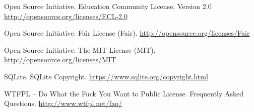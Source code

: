 \documentclass[12pt,letterpaper]{article}
\begin{document}
\begin{thebibliography}{20}
 Open Source Initiative. Education Community License, Version 2.0 \url{http://opensource.org/licenses/ECL-2.0}

 Open Source Initiative. Fair License (Fair). \url{http://opensource.org/licenses/Fair}

 Open Source Initiative. The MIT License (MIT). \url{http://opensource.org/licenses/MIT}

 SQLite. SQLite Copyright. \url{https://www.sqlite.org/copyright.html}

 WTFPL – Do What the Fuck You Want to Public License. Frequently Asked Questions. \url{http://www.wtfpl.net/faq/}

\end{thebibliography}





\end{document}
